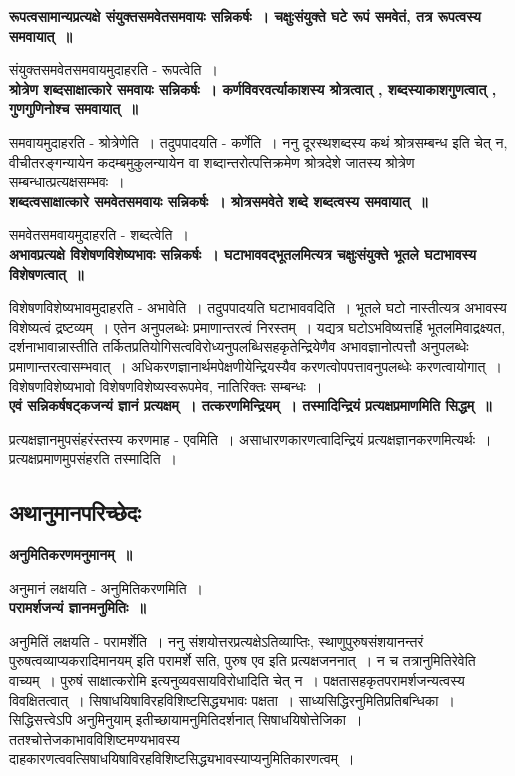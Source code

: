{\bfseries रूपत्वसामान्यप्रत्यक्षे संयुक्तसमवेतसमवायः सन्निकर्षः~। चक्षुःसंयुक्ते घटे रूपं समवेतं, तत्र रूपत्वस्य समवायात्~॥}\par
	संयुक्तसमवेतसमवायमुदाहरति - रूपत्वेति~।\\[10pt]
{\bfseries श्रोत्रेण शब्दसाक्षात्कारे समवायः सन्निकर्षः~। कर्णविवरवर्त्याकाशस्य श्रोत्रत्वात् , शब्दस्याकाशगुणत्वात् , गुणगुणिनोश्च समवायात्~॥}\par
	समवायमुदाहरति - श्रोत्रेणेति~। तदुपपादयति - कर्णेति~। ननु दूरस्थशब्दस्य कथं श्रोत्रसम्बन्ध इति चेत् न, वीचीतरङ्गन्यायेन कदम्बमुकुलन्यायेन वा शब्दान्तरोत्पत्तिक्रमेण श्रोत्रदेशे जातस्य श्रोत्रेण सम्बन्धात्प्रत्यक्षसम्भवः~।\\[10pt]
{\bfseries शब्दत्वसाक्षात्कारे समवेतसमवायः सन्निकर्षः~। श्रोत्रसमवेते शब्दे शब्दत्वस्य समवायात्~॥}\par
	समवेतसमवायमुदाहरति - शब्दत्वेति~।\\[10pt]
{\bfseries अभावप्रत्यक्षे विशेषणविशेष्यभावः सन्निकर्षः~। घटाभाववद्भूतलमित्यत्र चक्षुःसंयुक्ते भूतले घटाभावस्य विशेषणत्वात्~॥}\par
	विशेषणविशेष्यभावमुदाहरति - अभावेति~। तदुपपादयति घटाभाववदिति~। भूतले घटो नास्तीत्यत्र अभावस्य विशेष्यत्वं द्रष्टव्यम्~। एतेन अनुपलब्धेः प्रमाणान्तरत्वं निरस्तम्~। यद्यत्र घटोऽभविष्यत्तर्हि भूतलमिवाद्रक्ष्यत, दर्शनाभावान्नास्तीति तर्कितप्रतियोगिसत्वविरोध्यनुपलब्धिसहकृतेन्द्रियेणैव अभावज्ञानोत्पत्तौ अनुपलब्धेः प्रमाणान्तरत्वासम्भवात्~। अधिकरणज्ञानार्थमपेक्षणीयेन्द्रियस्यैव करणत्वोपपत्तावनुपलब्धेः करणत्वायोगात्~। विशेषणविशेष्यभावो विशेषणविशेष्यस्वरूपमेव, नातिरिक्तः सम्बन्धः~।\\[10pt]
{\bfseries एवं सन्निकर्षषट्कजन्यं ज्ञानं प्रत्यक्षम्~। तत्करणमिन्द्रियम्~। तस्मादिन्द्रियं प्रत्यक्षप्रमाणमिति सिद्धम्~॥}\par
	प्रत्यक्षज्ञानमुपसंहरंस्तस्य करणमाह - एवमिति~। असाधारणकारणत्वादिन्द्रियं प्रत्यक्षज्ञानकरणमित्यर्थः~। प्रत्यक्षप्रमाणमुपसंहरति तस्मादिति~। \subsection*{अथानुमानपरिच्छेदः}
{\bfseries अनुमितिकरणमनुमानम्~॥}\par
	अनुमानं लक्षयति - अनुमितिकरणमिति~।\\[10pt]
{\bfseries परामर्शजन्यं ज्ञानमनुमितिः~॥}\par
	अनुमितिं लक्षयति - परामर्शेति~। ननु संशयोत्तरप्रत्यक्षेऽतिव्याप्तिः, स्थाणुपुरुषसंशयानन्तरं पुरुषत्वव्याप्यकरादिमानयम् इति परामर्शे सति, पुरुष एव इति प्रत्यक्षजननात्~। न च तत्रानुमितिरेवेति वाच्यम्~। पुरुषं साक्षात्करोमि इत्यनुव्यवसायविरोधादिति चेत् न~। पक्षतासहकृतपरामर्शजन्यत्वस्य विवक्षितत्वात्~। सिषाधयिषाविरहविशिष्टसिद्ध्यभावः पक्षता~। साध्यसिद्धिरनुमितिप्रतिबन्धिका~। सिद्धिसत्त्वेऽपि अनुमिनुयाम् इतीच्छायामनुमितिदर्शनात् सिषाधयिषोत्तेजिका~। ततश्चोत्तेजकाभावविशिष्टमण्यभावस्य दाहकारणत्ववत्सिषाधयिषाविरहविशिष्टसिद्ध्यभावस्याप्यनुमितिकारणत्वम्~।\\[10pt]
